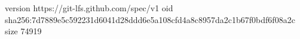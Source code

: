 version https://git-lfs.github.com/spec/v1
oid sha256:7d7889e5c592231d6041d28ddd6e5a108cfd4a8c8957da2c1b67f0bdf6f08a2c
size 74919
